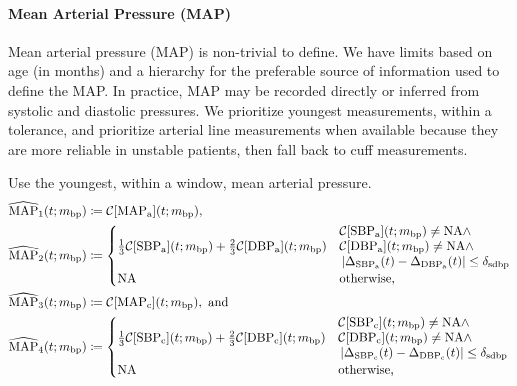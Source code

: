 \documentclass[letterpaper,10pt]{article}
\begin{document}
\paragraph{Mean Arterial Pressure (MAP)}

Mean arterial pressure (MAP) is non-trivial to define. We have limits based on
age (in months) and a hierarchy for the preferable source of information used to
define the MAP. In practice, MAP may be recorded directly or inferred from
systolic and diastolic pressures. We prioritize youngest measurements, within a
tolerance, and prioritize arterial line measurements when available because they
are more reliable in unstable patients, then fall back to cuff measurements.

Use the youngest, within a window, mean arterial pressure.
  \begin{equation}
    \label{eq:map-current-candidates}
    \begin{aligned}
    \widehat{\mathrm{MAP}}_{1}(t; m_{\mathrm{bp}})
      &\coloneqq \mathcal{C}[\mathrm{MAP}_{\mathrm{a}}](t;m_{\mathrm{bp}}), \\
    \widehat{\mathrm{MAP}}_{2}(t; m_{\mathrm{bp}})
      &\coloneqq
      \begin{cases}
        \frac{1}{3}\mathcal{C}[\mathrm{SBP}_{\mathrm{a}}](t;m_{\mathrm{bp}})
        + \frac{2}{3}\mathcal{C}[\mathrm{DBP}_{\mathrm{a}}](t;m_{\mathrm{bp}}) &
        \begin{aligned}
          &\mathcal{C}[\mathrm{SBP}_{\mathrm{a}}](t;m_{\mathrm{bp}}) \ne \mathrm{NA}
          \wedge \\
          &\mathcal{C}[\mathrm{DBP}_{\mathrm{a}}](t;m_{\mathrm{bp}}) \ne \mathrm{NA}
          \wedge \\
          &\left\lvert
          \Delta_{\mathrm{SBP}_{\mathrm{a}}}(t) - \Delta_{\mathrm{DBP}_{\mathrm{a}}}(t)
          \right\rvert \leq \delta_{\mathrm{sdbp}}
        \end{aligned} \\
        \mathrm{NA} & \text{otherwise,}
      \end{cases} \\
    \widehat{\mathrm{MAP}}_{3}(t; m_{\mathrm{bp}})
      &\coloneqq \mathcal{C}[\mathrm{MAP}_{\mathrm{c}}](t;m_{\mathrm{bp}}), \text{ and} \\
    \widehat{\mathrm{MAP}}_{4}(t; m_{\mathrm{bp}})
      &\coloneqq
      \begin{cases}
        \frac{1}{3}\mathcal{C}[\mathrm{SBP}_{\mathrm{c}}](t;m_{\mathrm{bp}})
        + \frac{2}{3}\mathcal{C}[\mathrm{DBP}_{\mathrm{c}}](t;m_{\mathrm{bp}}) &
        \begin{aligned}
          &\mathcal{C}[\mathrm{SBP}_{\mathrm{c}}](t;m_{\mathrm{bp}}) \ne \mathrm{NA}
          \wedge \\
          &\mathcal{C}[\mathrm{DBP}_{\mathrm{c}}](t;m_{\mathrm{bp}}) \ne \mathrm{NA}
          \wedge \\
          &\left\lvert
          \Delta_{\mathrm{SBP}_{\mathrm{c}}}(t) - \Delta_{\mathrm{DBP}_{\mathrm{c}}}(t)
          \right\rvert \leq \delta_{\mathrm{sdbp}}
        \end{aligned} \\
        \mathrm{NA} & \text{otherwise,}
      \end{cases}
  \end{aligned}
\end{equation}
\end{document}
